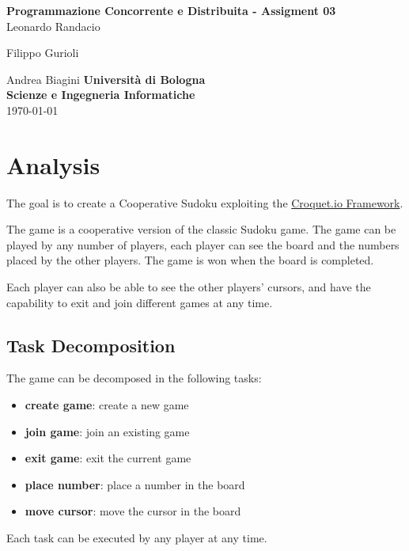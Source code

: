 \documentclass[12pt, a4paper]{report}
\begin{document}
\renewcommand\bibname{References} %


\begin{titlepage}

\begin{center}

\Large \textbf {Programmazione Concorrente e Distribuita - Assigment 03}\\%
\vspace{1em}%
\vfill
Leonardo Randacio


Filippo Gurioli


Andrea Biagini
\vspace{1em}
\vfill
{\bf Università di Bologna \\ Scienze e Ingegneria Informatiche}\\[0.5in]

       
\vfill
\today

\end{center}

\end{titlepage}


\tableofcontents
\listoffigures

\newpage
{} %

\chapter{Analysis}
The goal is to create a Cooperative Sudoku exploiting the \href{https://croquet.io/}{Croquet.io Framework}.

The game is a cooperative version of the classic Sudoku game. The game can be played by any number of players, each player can see the
 board and the numbers placed by the other players. The game is won when the board is completed.

Each player can also be able to see the other players' cursors, and have the capability to exit and join different games at any time.

\section{Task Decomposition}
The game can be decomposed in the following tasks:
\begin{itemize}
    \item \textbf{create game}: create a new game
    \item \textbf{join game}: join an existing game
    \item \textbf{exit game}: exit the current game
    \item \textbf{place number}: place a number in the board
    \item \textbf{move cursor}: move the cursor in the board
\end{itemize}
Each task can be executed by any player at any time.
\end{document}
